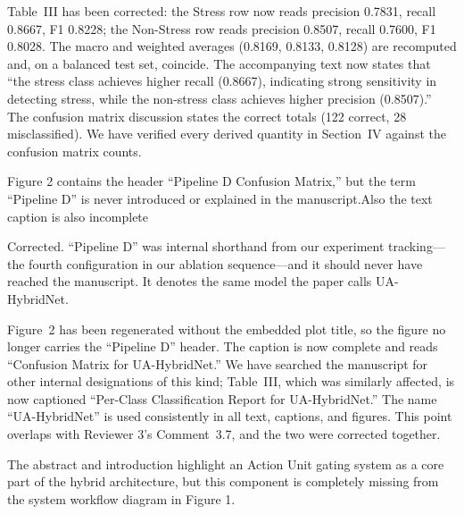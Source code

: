 \begin{changesblock}
Table~III has been corrected: the Stress row now reads precision
0.7831, recall 0.8667, F1 0.8228; the Non-Stress row reads precision
0.8507, recall 0.7600, F1 0.8028. The macro and weighted averages
(0.8169, 0.8133, 0.8128) are recomputed and, on a balanced test set,
coincide. The accompanying text now states that ``the stress class
achieves higher recall (0.8667), indicating strong sensitivity in
detecting stress, while the non-stress class achieves higher precision
(0.8507).'' The confusion matrix discussion states the correct totals
(122 correct, 28 misclassified). We have verified every derived quantity
in Section~IV against the confusion matrix counts.
\end{changesblock}


\begin{reviewercomment}
Figure 2 contains the header ``Pipeline D Confusion Matrix,'' but the term
``Pipeline D'' is never introduced or explained in the manuscript.Also the
text caption is also incomplete
\end{reviewercomment}

\response Corrected. ``Pipeline D'' was internal shorthand from our
experiment tracking---the fourth configuration in our ablation
sequence---and it should never have reached the manuscript. It denotes
the same model the paper calls UA-HybridNet.

\begin{changesblock}
Figure~2 has been regenerated without the embedded plot title,
so the figure no longer carries the ``Pipeline D'' header. The caption is
now complete and reads ``Confusion Matrix for UA-HybridNet.'' We have
searched the manuscript for other internal designations of this kind;
Table~III, which was similarly affected, is now captioned ``Per-Class
Classification Report for UA-HybridNet.'' The name ``UA-HybridNet'' is
used consistently in all text, captions, and figures. This point overlaps
with Reviewer 3's Comment~3.7, and the two were corrected together.
\end{changesblock}


\begin{reviewercomment}
The abstract and introduction highlight an Action Unit gating system as a
core part of the hybrid architecture, but this component is completely
missing from the system workflow diagram in Figure 1.
\end{reviewercomment}


